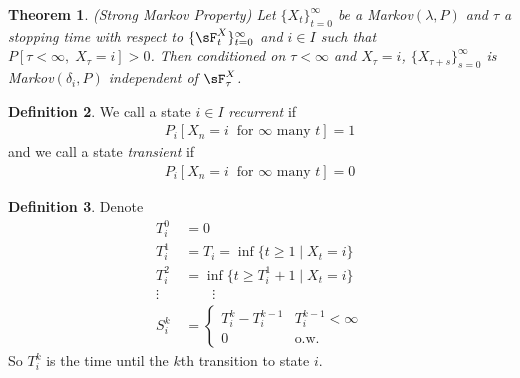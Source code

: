 \documentclass[12pt]{article}
\theoremstyle{plain}
\newtheorem{thm}{Theorem}[section]
\theoremstyle{definition}
\newtheorem{defn}[thm]{Definition}
\theoremstyle{remark}
\newcommand{\tinfz}{_{t=0}^\infty}
\begin{document}
\begin{thm}\emph{(Strong Markov Property)}
Let $\{X_t\}\tinfz$ be a Markov$(\lambda,P)$ and $\tau$ a stopping time
with respect to $\{\sF_t^X\}\tinfz$ and $i\in I$ such that
$P[\tau<\infty, \; X_\tau=i]>0$. Then conditioned on $\tau<\infty$ and
$X_\tau=i$, $\{X_{\tau+s}\}_{s=0}^\infty$ is Markov$(\delta_i,P)$
independent of $\sF_\tau^X$.
\end{thm}

\begin{defn}
We call a state $i\in I$ \emph{recurrent} if
\begin{align*}
  P_i[X_n=i \;\; \text{for $\infty$ many $t$}]=1
\end{align*}
and we call a state \emph{transient} if
\begin{align*}
  P_i[X_n=i \;\; \text{for $\infty$ many $t$}]=0
\end{align*}
\end{defn}

\begin{defn}
Denote
\begin{align*}
  T_i^0 &= 0 \\
  T_i^1 &= T_i = \inf\{t \geq 1 \;|\; X_t=i\} \\
  T_i^2 &= \inf\{t \geq T_i^1 + 1 \;|\; X_t=i\} \\
  \vdots \quad &\qquad \vdots \\
  S_i^k &=
  \begin{cases}
    T_i^k- T_i^{k-1} & T_i^{k-1} < \infty \\
    0 & \text{o.w.}
  \end{cases}
\end{align*}
So $T^k_i$ is the time until the $k$th transition to state $i$.
\end{defn}


\end{document}
